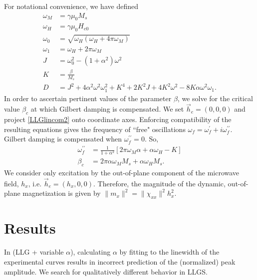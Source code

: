 \documentclass{article}
\begin{document}
For notational convenience, we have defined
\begin{align}
\omega_{M} &= \gamma \mu_{0} M_{s} \\
\omega_{H} &= \gamma \mu_{0} H_{e0} \\
\omega_{0} &= \sqrt{\omega_{H} \left( \omega_{H} + 4 \pi \omega_{M} \right)} \\
\omega_{1} &= \omega_{H} + 2 \pi \omega_{M} \\
J &= \omega_{0}^2 - \left( 1 + \alpha^2 \right) \omega^2 \\
K &= \frac{\beta}{M_{s}} \\
D &= J^2 + 4 \alpha^2 \omega^2 \omega_{1}^2 + K^4 + 2 K^2 J + 4 K^2 \omega^2 - 8 K \alpha \omega^2 \omega_{1}.
\end{align}
In order to ascertain pertinent values of the parameter $\beta$, we solve for the critical value $\beta_{c}$ at which Gilbert damping is compensated. 
We set $\vec{h}_{e} = (0,0,0)$ and project \eqref{LLGlincom2} onto coordinate axes. 
Enforcing compatibility of the resulting equations gives the frequency of ``free" oscillations $\omega_{f} = \omega_{f}^{\prime} + i \omega_{f}^{\prime\prime}$. 
Gilbert damping is compensated when $\omega_{f}^{\prime\prime} = 0$. 
So,
\begin{align}
\omega_{f}^{\prime\prime} &= \frac{1}{1 + \alpha^2} \left[ 2 \pi \omega_{M} \alpha + \alpha \omega_{H} - K \right] \\
\beta_{c} &= 2 \pi \alpha \omega_{M} M_{s} + \alpha \omega_{H} M_{s}.
\end{align}
We consider only excitation by the out-of-plane component of the microwave field, $h_{x}$, i.e. $\vec{h}_{e} = (h_{x},0,0)$. 
Therefore, the magnitude of the dynamic, out-of-plane magnetization is given by $\| m_{x} \|^2 = \| \chi_{xx} \|^2 h_{x}^2$.
\section{Results}
In (LLG + variable $\alpha$), calculating $\alpha$ by fitting to the linewidth of the experimental curves results in incorrect prediction of the (normalized) peak amplitude.
We search for qualitatively different behavior in LLGS.
\end{document}
